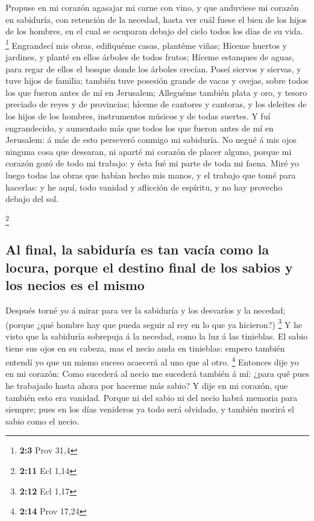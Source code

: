  Propuse en mi corazón agasajar mi carne con vino, y que
anduviese mi corazón en sabiduría, con retención de la necedad, hasta
ver cuál fuese el bien de los hijos de los hombres, en el cual se
ocuparan debajo del cielo todos los días de su vida. \footnote{\textbf{2:3}
  Prov 31,4}  Engrandecí mis obras, edifiquéme casas,
plantéme viñas;  Híceme huertos y jardines, y planté en
ellos árboles de todos frutos;  Híceme estanques de aguas,
para regar de ellos el bosque donde los árboles crecían. 
Poseí siervos y siervas, y tuve hijos de familia; también tuve posesión
grande de vacas y ovejas, sobre todos los que fueron antes de mí en
Jerusalem;  Alleguéme también plata y oro, y tesoro
preciado de reyes y de provincias; híceme de cantores y cantoras, y los
deleites de los hijos de los hombres, instrumentos músicos y de todas
suertes.  Y fuí engrandecido, y aumentado más que todos
los que fueron antes de mí en Jerusalem: á más de esto perseveró conmigo
mi sabiduría.  No negué á mis ojos ninguna cosa que
desearan, ni aparté mi corazón de placer alguno, porque mi corazón gozó
de todo mi trabajo: y ésta fué mi parte de toda mi faena.
 Miré yo luego todas las obras que habían hecho mis
manos, y el trabajo que tomé para hacerlas: y he aquí, todo vanidad y
aflicción de espíritu, y no hay provecho debajo del sol.

\footnote{\textbf{2:11} Ecl 1,14}

\hypertarget{al-final-la-sabiduruxeda-es-tan-vacuxeda-como-la-locura-porque-el-destino-final-de-los-sabios-y-los-necios-es-el-mismo}{%
\subsection{Al final, la sabiduría es tan vacía como la locura, porque
el destino final de los sabios y los necios es el
mismo}\label{al-final-la-sabiduruxeda-es-tan-vacuxeda-como-la-locura-porque-el-destino-final-de-los-sabios-y-los-necios-es-el-mismo}}

 Después torné yo á mirar para ver la sabiduría y los
desvaríos y la necedad; (porque ¿qué hombre hay que pueda seguir al rey
en lo que ya hicieron?) \footnote{\textbf{2:12} Ecl 1,17}
 Y he visto que la sabiduría sobrepuja á la necedad, como
la luz á las tinieblas.  El sabio tiene sus ojos en su
cabeza, mas el necio anda en tinieblas: empero también entendí yo que un
mismo suceso acaecerá al uno que al otro. \footnote{\textbf{2:14} Prov
  17,24}  Entonces dije yo en mi corazón: Como sucederá
al necio me sucederá también á mí: ¿para qué pues he trabajado hasta
ahora por hacerme más sabio? Y dije en mi corazón, que también esto era
vanidad.  Porque ni del sabio ni del necio habrá memoria
para siempre; pues en los días venideros ya todo será olvidado, y
también morirá el sabio como el necio.

